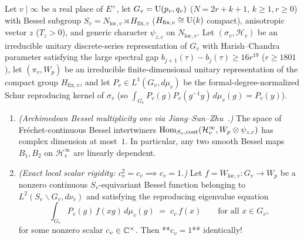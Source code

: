\begin{proposition}[Archimedean Bessel multiplicity one and exact local scalar rigidity ($c_v = 1$)]
\label{prop:16:jsz-locscalar}
Let $v \mid \infty$ be a real place of $E^+$, let $G_v = \mathrm{U}(p_v, q_v)$ ($N = 2r + k + 1$, $k \ge 1, r \ge 0$) with Bessel subgroup $S_v = N_{\mathrm{loc}, v} \rtimes H_{\mathrm{fix}, v}$ ($H_{\mathrm{fix}, v} \cong \mathrm{U}(k)$ compact), anisotropic vector $z$ ($T_z > 0$), and generic character $\psi_{z, c}$ on $N_{\mathrm{loc}, v}$. Let $(\sigma_v, \mathcal{H}_v)$ be an irreducible unitary discrete-series representation of $G_v$ with Harish--Chandra parameter satisfying the large spectral gap $b_{j+1}(\tau) - b_j(\tau) \ge 16 r^{19}$ ($r \ge 1801$), let $(\pi_v, W_p)$ be an irreducible finite-dimensional unitary representation of the compact group $H_{\mathrm{fix}, v}$, and let $P_v \in L^1(G_v, d\mu_v)$ be the formal-degree-normalized Schur reproducing kernel of $\sigma_v$ (so $\int_{G_v} P_v(g) P_v(g^{-1} y)\, d\mu_v(g) = P_v(y)$).
\begin{enumerate}[label=\textup{(\roman*)}]
\item \emph{(Archimedean Bessel multiplicity one via Jiang--Sun--Zhu~\cite{JiangSunZhu2010}.)} The space of Fr\'echet-continuous Bessel intertwiners $\mathrm{Hom}_{S_v, \mathrm{cont}}(\mathcal{H}_v^\infty, W_p \otimes \psi_{z,c})$ has complex dimension at most~$1$. In particular, any two smooth Bessel maps $B_1, B_2$ on $\mathcal{H}_v^\infty$ are linearly dependent.
\item \emph{(Exact local scalar rigidity: $c_v^2 = c_v \implies c_v = 1$.)} Let $f = W_{\mathrm{loc}, v} : G_v \to W_p$ be a nonzero continuous $S_v$-equivariant Bessel function belonging to $L^2(S_v \backslash G_v, d\nu_v)$ and satisfying the reproducing eigenvalue equation
  \begin{equation}
  \label{eq:16:cv-eigen}
    \int_{G_v} P_v(g)\, f(x g)\, d\mu_v(g) \;=\; c_v\, f(x) \qquad \text{for all } x \in G_v,
  \end{equation}
  for some nonzero scalar $c_v \in \mathbb{C}^\times$. Then **$c_v = 1$** identically!
\end{enumerate}
\end{proposition}


